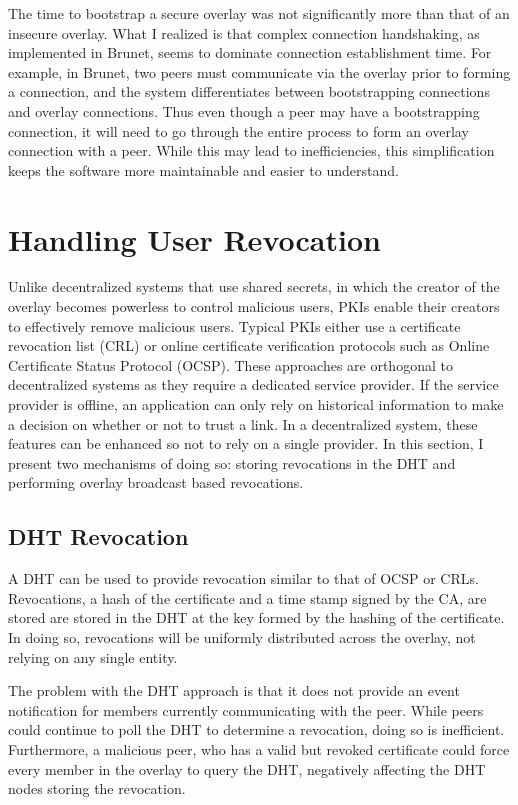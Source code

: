 The time to bootstrap a secure overlay was not significantly more than that of
an insecure overlay.  What I realized is that complex connection handshaking,
as implemented in Brunet, seems to dominate connection establishment time.  For
example, in Brunet, two peers must communicate via the overlay prior to forming
a connection, and the system differentiates between bootstrapping connections
and overlay connections.  Thus even though a peer may have a bootstrapping
connection, it will need to go through the entire process to form an overlay
connection with a peer.  While this may lead to inefficiencies, this
simplification keeps the software more maintainable and easier to understand.

\section{Handling User Revocation}
\label{vpn:revocation}

Unlike decentralized systems that use shared secrets, in which the creator of
the overlay becomes powerless to control malicious users, PKIs enable their
creators to effectively remove malicious users.  Typical PKIs either use a
certificate revocation list (CRL) or online certificate verification protocols
such as Online Certificate Status Protocol (OCSP).  These approaches are
orthogonal to decentralized systems as they require a dedicated service
provider.  If the service provider is offline, an application can only rely on
historical information to make a decision on whether or not to trust a link.
In a decentralized system, these features can be enhanced so not to rely on a
single provider.  In this section, I present two mechanisms of doing so:
storing revocations in the DHT and performing overlay broadcast based
revocations.

\subsection{DHT Revocation}

A DHT can be used to provide revocation similar to that of OCSP or CRLs.
Revocations, a hash of the certificate and a time stamp signed by the CA, are
stored  are stored in the DHT at the key formed by the hashing of the
certificate.  In doing so, revocations will be uniformly distributed across the
overlay, not relying on any single entity.

The problem with the DHT approach is that it does not provide an event
notification for members currently communicating with the peer.  While peers
could continue to poll the DHT to determine a revocation, doing so is
inefficient.  Furthermore, a malicious peer, who has a valid but revoked
certificate could force every member in the overlay to query the DHT,
negatively affecting the DHT nodes storing the revocation.

